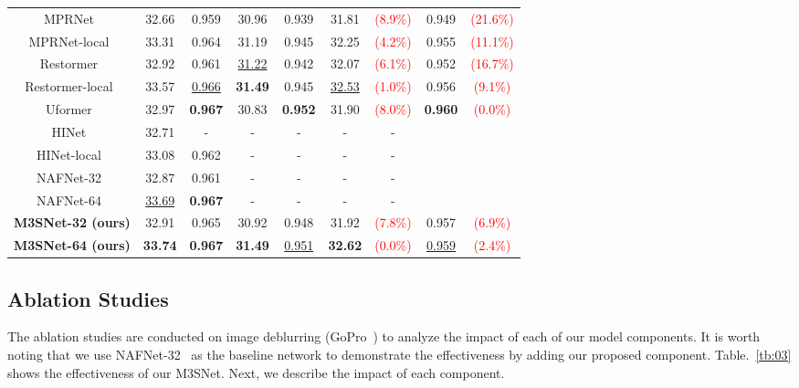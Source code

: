 \documentclass[sn-mathphys,Numbered]{sn-jnl}
\theoremstyle{thmstyleone}\newtheorem{theorem}{Theorem}\newtheorem{proposition}[theorem]{Proposition}
\theoremstyle{thmstyletwo}\newtheorem{example}{Example}\newtheorem{remark}{Remark}
\theoremstyle{thmstylethree}\newtheorem{definition}{Definition}
\begin{document}
\begin{table}[ht]
\begin{tabular}{ccccc||cccc}
    MPRNet~\cite{Zamir2021MPRNet} & 32.66 & 0.959 & 30.96 & 0.939 &31.81 &\textcolor{red}{(8.9\%)} &0.949&\textcolor{red}{(21.6\%)}
    \\
    MPRNet-local~\cite{Zamir2021MPRNet} & 33.31 & 0.964 &31.19 &0.945 &32.25 &\textcolor{red}{(4.2\%)}&0.955&\textcolor{red}{(11.1\%)}
    \\
    Restormer~\cite{Zamir2021Restormer} & 32.92 & 0.961 & \underline{31.22} & 0.942 &32.07 &\textcolor{red}{(6.1\%)}&0.952&\textcolor{red}{(16.7\%)}
    \\
    Restormer-local~\cite{Zamir2021Restormer} & 33.57 & \underline{0.966} & \textbf{31.49} & 0.945 &\underline{32.53}  &\textcolor{red}{(1.0\%)}&0.956&\textcolor{red}{(9.1\%)}
    \\
    Uformer~\cite{Wang_2022_CVPR} &32.97 & \textbf{0.967} &30.83 &\textbf{0.952} &31.90  &\textcolor{red}{(8.0\%)}&\textbf{0.960}&\textcolor{red}{(0.0\%)}
     \\
    HINet~\cite{Chen_2021_CVPR}&32.71&-&-&-&-&-
    \\
    HINet-local~\cite{Chen_2021_CVPR}&33.08&0.962&-&-&-&-
    \\
    \hline
    NAFNet-32~\cite{chen2022simple}&32.87&0.961&-&-&-&-
    \\
    NAFNet-64~\cite{chen2022simple}&\underline{33.69}&\textbf{0.967}&-&-&-&-
    \\
    \hline
    \textbf{M3SNet-32 (ours)}&32.91&0.965&30.92&0.948&31.92 &\textcolor{red}{(7.8\%)} &0.957&\textcolor{red}{(6.9\%)}
    \\
    \textbf{M3SNet-64 (ours)}&\textbf{33.74}&\textbf{0.967}&\textbf{31.49}&\underline{0.951}&\textbf{32.62} &\textcolor{red}{(0.0\%)} & \underline{0.959}&\textcolor{red}{(2.4\%)}
    \\
    \hline
\end{tabular}

\end{table}



\subsection{Ablation Studies}
The ablation studies are conducted on image deblurring (GoPro~\cite{Gopro}) to analyze the impact of each of our model components. It is worth noting that we use NAFNet-32~\cite{chen2022simple} as the baseline network to demonstrate the effectiveness by adding our proposed component. Table.~\ref{tb:03} shows the effectiveness of our M3SNet. Next, we describe the impact of each component.
\end{document}
